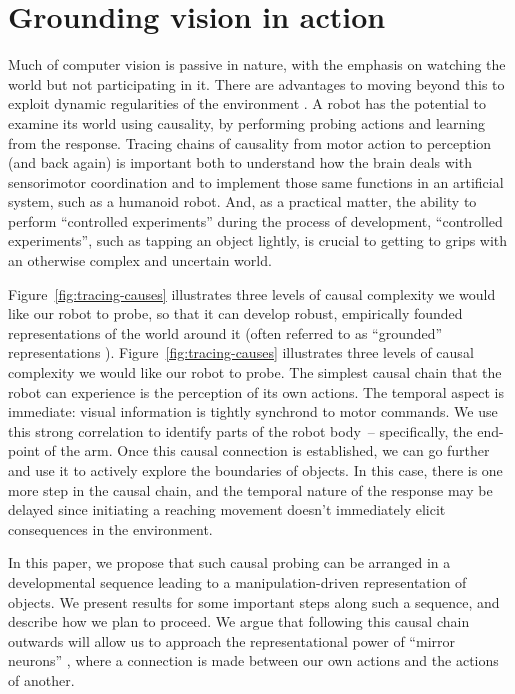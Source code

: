 \section{Grounding vision in action}

Much of computer vision is passive in nature, with the emphasis on
watching the world but not participating in it.  There are advantages
to moving beyond this to exploit dynamic regularities of the
environment \cite{ballard91animate}.
A robot has the
potential to examine its world using causality, by performing probing
actions and learning from the response.  Tracing chains of causality
from motor action to perception (and back again) is important both to
understand how the brain deals with sensorimotor coordination and to
implement those same functions in an artificial system, such as a
humanoid robot.  And, as a practical matter, the ability to perform
\ifrevised
``controlled experiments'' during the process of development,
\else
``controlled experiments'', 
\fi
such as tapping an object lightly, is
crucial to getting to grips with an otherwise complex and uncertain
world.

\ifrevised
Figure~\ref{fig:tracing-causes} illustrates three levels of causal complexity
we would like our robot to probe, so 
that it can develop robust, empirically founded
representations of the world around it
(often referred to as ``grounded'' representations \cite{brooks90elephants}).
\else
Figure~\ref{fig:tracing-causes} illustrates three levels of causal complexity
we would like our robot to probe.
\fi
The simplest causal chain that the robot can experience is the
perception of its own actions.  The temporal aspect is immediate:
visual information is tightly synchron\ize{}d to motor commands.
We use this strong correlation to identify parts of the robot
body~-- specifically, the end-point of the arm. 
%
Once this causal connection is established, we can go further and use
it to actively explore the boundaries of objects.  In this case, there
is one more step in the causal chain, and the temporal nature of
the response may be delayed since initiating a reaching movement doesn't
immediately elicit consequences in the environment.  


In this paper, we propose that such causal probing can be arranged in
a developmental sequence leading to a manipulation-driven
representation of objects.  We present results for some important
steps along such a sequence, and describe how we plan to proceed.  We
argue that following this causal chain outwards will allow us to
approach the representational power of ``mirror neurons''
\cite{gallese-fadiga-fogassi-rizzolatti-1996}, where a connection 
is made between our own actions and the actions of another.  

